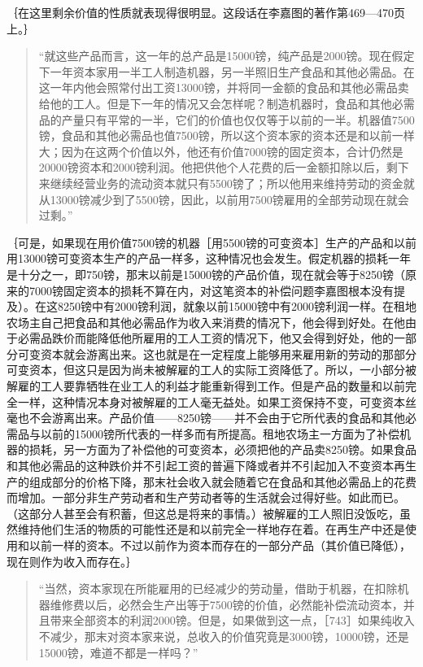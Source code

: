 ｛在这里剩余价值的性质就表现得很明显。这段话在李嘉图的著作第469—470页上。｝

\begin{quote}{“就这些产品而言，这一年的总产品是15000镑，纯产品是2000镑。现在假定下一年资本家用一半工人制造机器，另一半照旧生产食品和其他必需品。在这一年内他会照常付出工资13000镑，并将同一金额的食品和其他必需品卖给他的工人。但是下一年的情况又会怎样呢？制造机器时，食品和其他必需品的产量只有平常的一半，它们的价值也仅仅等于以前的一半。机器值7500镑，食品和其他必需品也值7500镑，所以这个资本家的资本还是和以前一样大；因为在这两个价值以外，他还有价值7000镑的固定资本，合计仍然是20000镑资本和2000镑利润。他把供他个人花费的后一金额扣除以后，剩下来继续经营业务的流动资本就只有5500镑了；所以他用来维持劳动的资金就从13000镑减少到了5500镑，因此，以前用7500镑雇用的全部劳动现在就会过剩。”}\end{quote}

｛可是，如果现在用价值7500镑的机器［用5500镑的可变资本］生产的产品和以前用13000镑可变资本生产的产品一样多，这种情况也会发生。假定机器的损耗一年是十分之一，即750镑，那末以前是15000镑的产品价值，现在就会等于8250镑（原来的7000镑固定资本的损耗不算在内，对这笔资本的补偿问题李嘉图根本没有提及）。在这8250镑中有2000镑利润，就象以前15000镑中有2000镑利润一样。在租地农场主自己把食品和其他必需品作为收入来消费的情况下，他会得到好处。在他由于必需品跌价而能降低他所雇用的工人工资的情况下，他又会得到好处，他的一部分可变资本就会游离出来。这也就是在一定程度上能够用来雇用新的劳动的那部分可变资本，但这只是因为尚未被解雇的工人的实际工资降低了。所以，一小部分被解雇的工人要靠牺牲在业工人的利益才能重新得到工作。但是产品的数量和以前完全一样，这种情况本身对被解雇的工人毫无益处。如果工资保持不变，可变资本丝毫也不会游离出来。产品价值——8250镑——并不会由于它所代表的食品和其他必需品与以前的15000镑所代表的一样多而有所提高。租地农场主一方面为了补偿机器的损耗，另一方面为了补偿他的可变资本，必须把他的产品卖8250镑。如果食品和其他必需品的这种跌价并不引起工资的普遍下降或者并不引起加入不变资本再生产的组成部分的价格下降，那末社会收入就会随着它在食品和其他必需品上的花费而增加。一部分非生产劳动者和生产劳动者等的生活就会过得好些。如此而已。（这部分人甚至会有积蓄，但这总是将来的事情。）被解雇的工人照旧没饭吃，虽然维持他们生活的物质的可能性还是和以前完全一样地存在着。在再生产中还是使用和以前一样的资本。不过以前作为资本而存在的一部分产品（其价值已降低），现在则作为收入而存在。｝

\begin{quote}{“当然，资本家现在所能雇用的已经减少的劳动量，借助于机器，在扣除机器维修费以后，必然会生产出等于7500镑的价值，必然能补偿流动资本，并且带来全部资本的利润2000镑。但是，如果做到这一点，［743］如果纯收入不减少，那末对资本家来说，总收入的价值究竟是3000镑，10000镑，还是15000镑，难道不都是一样吗？”}\end{quote}

